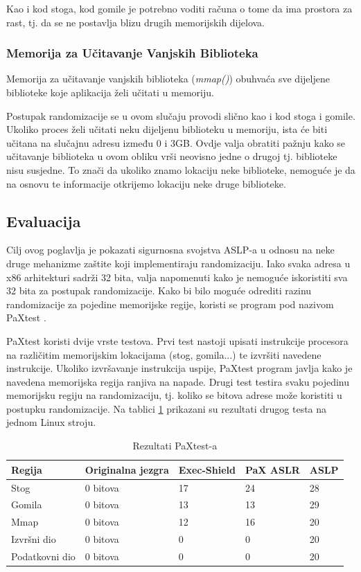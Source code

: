 \documentclass[times, utf8, diplomski, numeric]{fer}
\begin{document}
Kao i kod stoga, kod gomile je potrebno voditi računa o tome da
ima prostora za rast, tj. da se ne postavlja blizu drugih
memorijskih dijelova.

\subsubsection{Memorija za Učitavanje Vanjskih Biblioteka}

Memorija za učitavanje vanjskih biblioteka (\emph{mmap()})
obuhvaća sve dijeljene biblioteke koje aplikacija želi učitati u
memoriju. 

Postupak randomizacije se u ovom slučaju provodi slično kao i kod
stoga i gomile. Ukoliko proces želi učitati neku dijeljenu
biblioteku u memoriju, ista će biti učitana na slučajnu adresu
između 0 i 3GB. Ovdje valja obratiti pažnju kako se učitavanje
biblioteka u ovom obliku vrši neovisno jedne o drugoj tj.
biblioteke nisu susjedne. To znači da ukoliko znamo lokaciju neke
biblioteke, nemoguće je da na osnovu te informacije otkrijemo
lokaciju neke druge biblioteke.

\subsection{Evaluacija}

Cilj ovog poglavlja je pokazati sigurnosna svojstva ASLP-a u
odnosu na neke druge mehanizme zaštite koji implementiraju
randomizaciju. Iako svaka adresa u x86 arhitekturi sadrži 32
bita, valja napomenuti kako je nemoguće iskoristiti sva 32 bita
za postupak randomizacije. Kako bi bilo moguće odrediti razinu
randomizacije za pojedine memorijske regije, koristi se program
pod nazivom PaXtest \citep{pax_test}. 

PaXtest koristi dvije vrste testova. Prvi test nastoji upisati
instrukcije procesora na različitim memorijskim lokacijama (stog,
gomila...) te izvršiti navedene instrukcije. Ukoliko izvršavanje
instrukcija uspije, PaXtest program javlja kako je navedena
memorijska regija ranjiva na napade. Drugi test testira svaku
pojedinu memorijsku regiju na randomizaciju, tj. koliko se bitova
adrese može koristiti u postupku randomizacije. Na tablici
\ref{tbl:paxtest_results} prikazani su rezultati drugog testa na
jednom Linux stroju.

\begin{table}[htb]
\small
\caption{Rezultati PaXtest-a}
\label{tbl:paxtest_results}
\centering
\begin{tabular}{|l|l|l|l|l|}
\hline
Regija & Originalna jezgra & Exec-Shield & PaX ASLR & ASLP \\ \hline
Stog & 0 bitova & 17 & 24 & 28 \\ \hline
Gomila & 0 bitova & 13 & 13 & 29 \\ \hline
Mmap & 0 bitova & 12 & 16 & 20 \\ \hline
Izvršni dio & 0 bitova & 0 & 0 & 20 \\ \hline
Podatkovni dio & 0 bitova & 0 & 0 & 20 \\ \hline
\end{tabular}
\end{table}
\end{document}
